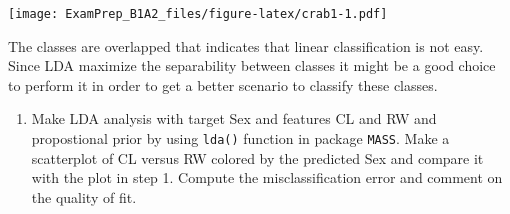 \documentclass[
]{article}
\newenvironment{Shaded}{\begin{snugshade}}{\end{snugshade}}
\newcommand{\DataTypeTok}[1]{\textcolor[rgb]{0.13,0.29,0.53}{#1}}
\newcommand{\KeywordTok}[1]{\textcolor[rgb]{0.13,0.29,0.53}{\textbf{#1}}}
\newcommand{\NormalTok}[1]{#1}
\newcommand{\OperatorTok}[1]{\textcolor[rgb]{0.81,0.36,0.00}{\textbf{#1}}}
\newcommand{\StringTok}[1]{\textcolor[rgb]{0.31,0.60,0.02}{#1}}
\providecommand{\tightlist}{%
  \setlength{\itemsep}{0pt}\setlength{\parskip}{0pt}}
\begin{document}
\texttt{[image: ExamPrep\_B1A2\_files/figure-latex/crab1-1.pdf]}

The classes are overlapped that indicates that linear classification is
not easy. Since LDA maximize the separability between classes it might
be a good choice to perform it in order to get a better scenario to
classify these classes.

\begin{enumerate}
\def\labelenumi{\arabic{enumi}.}
\setcounter{enumi}{1}
\tightlist
\item
  Make LDA analysis with target Sex and features CL and RW and
  propostional prior by using \texttt{lda()} function in package
  \texttt{MASS}. Make a scatterplot of CL versus RW colored by the
  predicted Sex and compare it with the plot in step 1. Compute the
  misclassification error and comment on the quality of fit.
\end{enumerate}

\begin{Shaded}
\end{Shaded}
\end{document}
